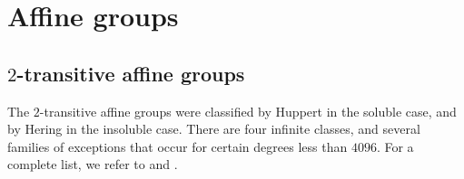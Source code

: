 \documentclass{article}
\theoremstyle{remark}
\theoremstyle{definition}
\begin{document}
 

\section{Affine groups}
\label{sec: affine groups}



\subsection{$2$-transitive affine groups}
The $2$-transitive affine groups were classified by Huppert \cite{Huppert} in the soluble case, and by Hering \cite{Hering} in the insoluble case.  There are four infinite classes, and several families of exceptions that occur for certain degrees less than $4096$.  For a complete list, we refer to \cite[Appendix 1]{Liebeck1984} and \cite[\S7.3]{Cameron}.
\end{document}
